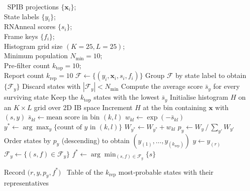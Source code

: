 \documentclass[%
aip,
 amsmath,amssymb,
reprint,%
twocolumn,
]{revtex4-1}
\begin{document}
{\begin{algorithm}[H]
  \caption{Boltzmann‑weighted state ranking and representative selection}
  \label{alg:state-ranking}
  \begin{algorithmic}[1]
    \REQUIRE\ SPIB projections $\{\mathbf{x}_{i}\}$;\\
    State labels $\{y_{i}\}$;\\
    RNAnneal scores $\{s_{i}\}$;\\ Frame keys $\{f_{i}\}$;\\ Histogram grid size $(K=25,L=25)$;\\ Minimum population $N_{\min}=10$;\\ Pre‑filter count $k_{\mathrm{top}}=10$;\\ Report count $k_{\mathrm{rep}}=10$
    \STATE $\mathcal{F}\!\leftarrow\!\{(y_{i},\mathbf{x}_{i},s_{i},f_{i})\}$ 
    \STATE Group $\mathcal{F}$ by state label to obtain $\{\mathcal{F}_y\}$
    \STATE Discard states with $|\mathcal{F}_y|<N_{\min}$
    \STATE Compute the average score $\bar{s}_y $ for every surviving state
    \STATE Keep the $k_{\mathrm{top}}$ states with the lowest $\bar{s}_y$
    \STATE Initialise histogram $H$ on an $K\times L$ grid over 2D IB space
      \STATE Increment $H$ at the bin containing $\mathbf{x}$ with $(s,y)$
    \ENDFOR
      \STATE $\bar{s}_{kl}\!\leftarrow\!\text{mean score in bin }(k,l)$
      \STATE $w_{kl}\!\leftarrow\!\exp(-\bar{s}_{kl})$ 
      \STATE $y^\ast\!\leftarrow\!\arg\max_y\{\text{count of }y\text{ in }(k,l)\}$ 
      \STATE $W_{y^\ast}\!\leftarrow\!W_{y^\ast}+w_{kl}$ 
    \ENDFOR
    \STATE $p_y\!\leftarrow\!W_y\,/\,\sum_{y'}W_{y'}$ 
    \STATE Order states by $p_y$ (descending) to obtain $(y_{(1)},\dots,y_{(k_{\mathrm{rep}})})$
      \STATE $y\!\leftarrow\!y_{(r)}$
      \STATE $\mathcal{F}_y\!\leftarrow\!\{(s,f)\in\mathcal{F}_y\}$
      \STATE $f^\ast\!\leftarrow\!\arg\min_{(s,f)\in\mathcal{F}_y}\{s\}$ 
      
      \STATE Record $\bigl(r,y,p_y,f^\ast\bigr)$
    \ENDFOR
    \RETURN\ Table of the $k_{\mathrm{rep}}$ most‑probable states with their representatives
  \end{algorithmic}
\end{algorithm}

}
\end{document}
